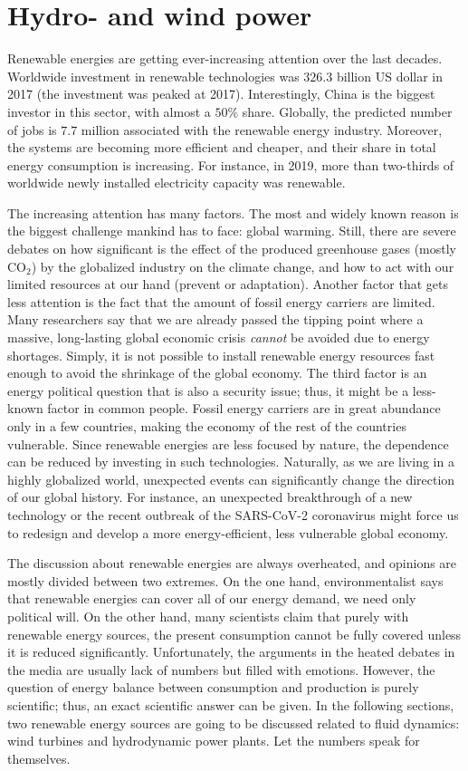 \chapter{Hydro- and wind power}

Renewable energies are getting ever-increasing attention over the last decades. Worldwide investment in renewable technologies was $326.3$ billion US dollar in 2017 (the investment was peaked at 2017). Interestingly, China is the biggest investor in this sector, with almost a $50\%$ share. Globally, the predicted number of jobs is $7.7$ million associated with the renewable energy industry. Moreover, the systems are becoming more efficient and cheaper, and their share in total energy consumption is increasing. For instance, in 2019, more than two-thirds of worldwide newly installed electricity capacity was renewable.

The increasing attention has many factors. The most and widely known reason is the biggest challenge mankind has to face: global warming. Still, there are severe debates on how significant is the effect of the produced greenhouse gases (mostly $\mathrm{CO}_2$) by the globalized industry on the climate change, and how to act with our limited resources at our hand (prevent or adaptation). Another factor that gets less attention is the fact that the amount of fossil energy carriers are limited. Many researchers say that we are already passed the tipping point where a massive, long-lasting global economic crisis \textit{cannot} be avoided due to energy shortages. Simply, it is not possible to install renewable energy resources fast enough to avoid the shrinkage of the global economy. The third factor is an energy political question that is also a security issue; thus, it might be a less-known factor in common people. Fossil energy carriers are in great abundance only in a few countries, making the economy of the rest of the countries vulnerable. Since renewable energies are less focused by nature, the dependence can be reduced by investing in such technologies. Naturally, as we are living in a highly globalized world, unexpected events can significantly change the direction of our global history. For instance, an unexpected breakthrough of a new technology or the recent outbreak of the SARS-CoV-2 coronavirus might force us to redesign and develop a more energy-efficient, less vulnerable global economy. 

The discussion about renewable energies are always overheated, and opinions are mostly divided between two extremes. On the one hand, environmentalist says that renewable energies can cover all of our energy demand, we need only political will. On the other hand, many scientists claim that purely with renewable energy sources, the present consumption cannot be fully covered unless it is reduced significantly. Unfortunately, the arguments in the heated debates in the media are usually lack of numbers but filled with emotions. However, the question of energy balance between consumption and production is purely scientific; thus, an exact scientific answer can be given. In the following sections, two renewable energy sources are going to be discussed related to fluid dynamics: wind turbines and hydrodynamic power plants. Let the numbers speak for themselves.


